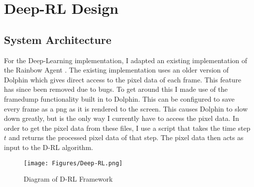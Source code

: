 \chapter{Deep-RL Design}
\section{System Architecture}
For the Deep-Learning implementation, I adapted an existing implementation of the Rainbow Agent \cite{hessel2018rainbow}. The existing implementation\cite{BenJMiddleton} uses an older version of Dolphin which gives direct access to the pixel data of each frame. This feature has since been removed due to bugs. To get around this I made use of the framedump functionality built in to Dolphin. This can be configured to save every frame as a png as it is rendered to the screen. This causes Dolphin to slow down greatly, but is the only way I currently have to access the pixel data. In order to get the pixel data from these files, I use a script that takes the time step $t$ and returns the processed pixel data of that step. The pixel data then acts as input to the D-RL algorithm.
\begin{figure}[ht]
    \centering
    \texttt{[image: Figures/Deep-RL.png]}
    \caption{Diagram of D-RL Framework}
    \label{fig:rainbow-arch}
\end{figure}
